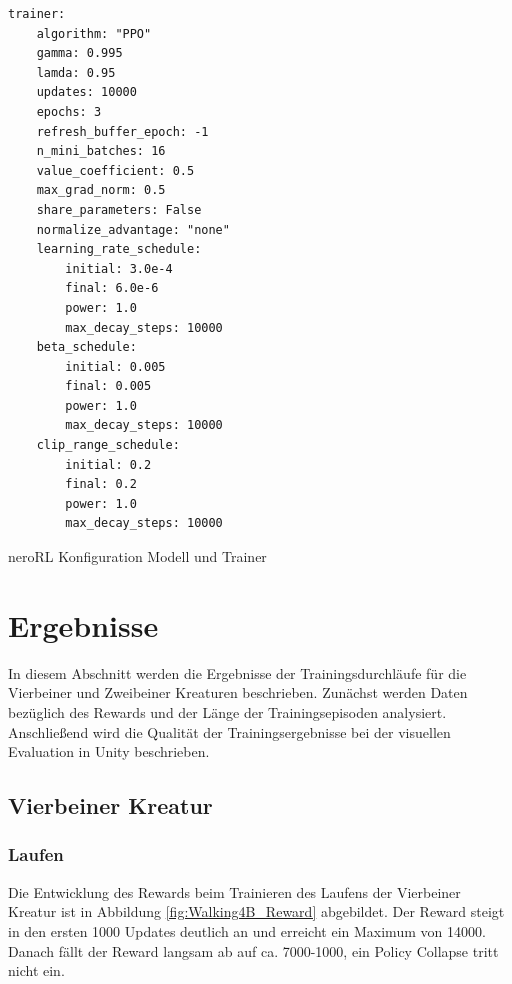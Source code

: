 \begin{listing}
\begin{verbatim}
trainer:
    algorithm: "PPO"
    gamma: 0.995
    lamda: 0.95
    updates: 10000
    epochs: 3
    refresh_buffer_epoch: -1
    n_mini_batches: 16
    value_coefficient: 0.5
    max_grad_norm: 0.5
    share_parameters: False
    normalize_advantage: "none"
    learning_rate_schedule:
        initial: 3.0e-4
        final: 6.0e-6
        power: 1.0
        max_decay_steps: 10000
    beta_schedule:
        initial: 0.005
        final: 0.005
        power: 1.0
        max_decay_steps: 10000
    clip_range_schedule:
        initial: 0.2
        final: 0.2
        power: 1.0
        max_decay_steps: 10000
		\end{verbatim}
	\caption{neroRL Konfiguration Modell und Trainer}
	\label{fig:evaluation_config_model_trainer}
\end{listing}


\section{Ergebnisse}
\label{ErgebnisseTraining}
In diesem Abschnitt werden die Ergebnisse der Trainingsdurchläufe für die Vierbeiner und Zweibeiner Kreaturen beschrieben. Zunächst werden Daten bezüglich des Rewards und der Länge der Trainingsepisoden analysiert. Anschließend wird die Qualität der Trainingsergebnisse bei der visuellen Evaluation in Unity beschrieben.

\subsection{Vierbeiner Kreatur}

\subsubsection{Laufen}
Die Entwicklung des Rewards beim Trainieren des Laufens der Vierbeiner Kreatur ist in Abbildung \ref{fig:Walking4B_Reward} abgebildet. Der Reward steigt in den ersten 1000 Updates deutlich an und erreicht ein Maximum von 14000. Danach fällt der Reward langsam ab auf ca. 7000-1000, ein Policy Collapse tritt nicht ein. 

